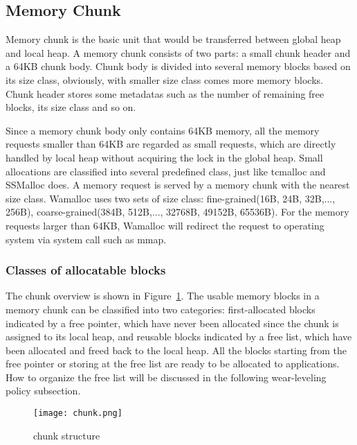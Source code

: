 \documentclass[10pt, conference, compsocconf]{IEEEtran}
\begin{document}
\subsection{Memory Chunk}

Memory chunk is the basic unit that would be transferred between global heap and local heap. 
A memory chunk consists of two parts: a small chunk header and a 64KB chunk body. 
Chunk body is divided into several memory blocks based on its size class,
obviously, with smaller size class comes more memory blocks. 
Chunk header stores some metadatas such as the number of remaining free blocks, its size class and so on.

Since a memory chunk body only contains 64KB memory, all the memory requests smaller than 64KB are regarded as small requests,
which are directly handled by local heap without acquiring the lock in the global heap.
Small allocations are classified into several predefined class,
just like tcmalloc\cite{ghemawat2009tcmalloc} and SSMalloc\cite{liu2012ssmalloc} does. 
A memory request is served by a memory chunk with the nearest size class. 
Wamalloc uses two sets of size class: fine-grained(16B, 24B, 32B,..., 256B), coarse-grained(384B, 512B,..., 32768B, 49152B, 65536B). 
For the memory requests larger than 64KB, Wamalloc will redirect the request to operating system via system call such as mmap.

\subsubsection{Classes of allocatable blocks}
The chunk overview is shown in Figure~\ref{fig:chunk}.
The usable memory blocks in a memory chunk can be classified into two categories:
first-allocated blocks indicated by a free pointer,
which have never been allocated since the chunk is assigned to its local heap,
and reusable blocks indicated by a free list, which have been allocated and freed back to the local heap.
All the blocks starting from the free pointer or storing at the free list are ready to be allocated to applications. 
How to organize the free list will be discussed in the following wear-leveling policy subsection.

\begin{figure}[h]
\centering
\texttt{[image: chunk.png]}
\caption{chunk structure}
\label{fig:chunk}
\end{figure}

\end{document}
